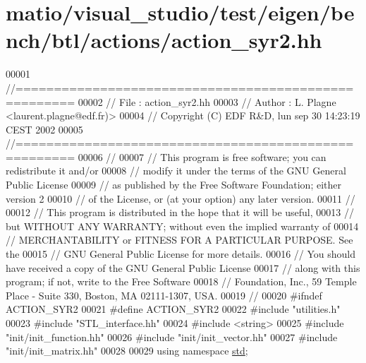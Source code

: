 \hypertarget{matio_2visual__studio_2test_2eigen_2bench_2btl_2actions_2action__syr2_8hh_source}{}\section{matio/visual\+\_\+studio/test/eigen/bench/btl/actions/action\+\_\+syr2.hh}
\label{matio_2visual__studio_2test_2eigen_2bench_2btl_2actions_2action__syr2_8hh_source}

\begin{DoxyCode}
00001 \textcolor{comment}{//=====================================================}
00002 \textcolor{comment}{// File   :  action\_syr2.hh}
00003 \textcolor{comment}{// Author :  L. Plagne <laurent.plagne@edf.fr)>}
00004 \textcolor{comment}{// Copyright (C) EDF R&D,  lun sep 30 14:23:19 CEST 2002}
00005 \textcolor{comment}{//=====================================================}
00006 \textcolor{comment}{//}
00007 \textcolor{comment}{// This program is free software; you can redistribute it and/or}
00008 \textcolor{comment}{// modify it under the terms of the GNU General Public License}
00009 \textcolor{comment}{// as published by the Free Software Foundation; either version 2}
00010 \textcolor{comment}{// of the License, or (at your option) any later version.}
00011 \textcolor{comment}{//}
00012 \textcolor{comment}{// This program is distributed in the hope that it will be useful,}
00013 \textcolor{comment}{// but WITHOUT ANY WARRANTY; without even the implied warranty of}
00014 \textcolor{comment}{// MERCHANTABILITY or FITNESS FOR A PARTICULAR PURPOSE.  See the}
00015 \textcolor{comment}{// GNU General Public License for more details.}
00016 \textcolor{comment}{// You should have received a copy of the GNU General Public License}
00017 \textcolor{comment}{// along with this program; if not, write to the Free Software}
00018 \textcolor{comment}{// Foundation, Inc., 59 Temple Place - Suite 330, Boston, MA  02111-1307, USA.}
00019 \textcolor{comment}{//}
00020 \textcolor{preprocessor}{#ifndef ACTION\_SYR2}
00021 \textcolor{preprocessor}{#define ACTION\_SYR2}
00022 \textcolor{preprocessor}{#include "utilities.h"}
00023 \textcolor{preprocessor}{#include "STL\_interface.hh"}
00024 \textcolor{preprocessor}{#include <string>}
00025 \textcolor{preprocessor}{#include "init/init\_function.hh"}
00026 \textcolor{preprocessor}{#include "init/init\_vector.hh"}
00027 \textcolor{preprocessor}{#include "init/init\_matrix.hh"}
00028 
00029 \textcolor{keyword}{using namespace }\hyperlink{namespacestd}{std};

\end{DoxyCode}
